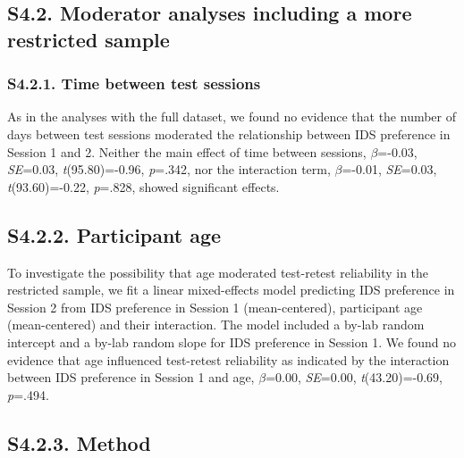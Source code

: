 \documentclass[
  man, donotrepeattitle,floatsintext]{apa6}
\begin{document}
\hypertarget{s4.2.-moderator-analyses-including-a-more-restricted-sample}{%
\subsection{S4.2. Moderator analyses including a more restricted sample}\label{s4.2.-moderator-analyses-including-a-more-restricted-sample}}

\hypertarget{s4.2.1.-time-between-test-sessions}{%
\subsubsection{S4.2.1. Time between test sessions}\label{s4.2.1.-time-between-test-sessions}}

As in the analyses with the full dataset, we found no evidence that the number of days between test sessions moderated the relationship between IDS preference in Session 1 and 2. Neither the main effect of time between sessions, \(\beta\)=-0.03, \emph{SE}=0.03, \emph{t}(95.80)=-0.96, \emph{p}=.342, nor the interaction term, \(\beta\)=-0.01, \emph{SE}=0.03, \emph{t}(93.60)=-0.22, \emph{p}=.828, showed significant effects.

\hypertarget{s4.2.2.-participant-age}{%
\subsection{S4.2.2. Participant age}\label{s4.2.2.-participant-age}}

To investigate the possibility that age moderated test-retest reliability in the restricted sample, we fit a linear mixed-effects model predicting IDS preference in Session 2 from IDS preference in Session 1 (mean-centered), participant age (mean-centered) and their interaction.
The model included a by-lab random intercept and a by-lab random slope for IDS preference in Session 1.
We found no evidence that age influenced test-retest reliability as indicated by the interaction between IDS preference in Session 1 and age, \(\beta\)=0.00, \emph{SE}=0.00, \emph{t}(43.20)=-0.69, \emph{p}=.494.

\hypertarget{s4.2.3.-method}{%
\subsection{S4.2.3. Method}\label{s4.2.3.-method}}
\end{document}
